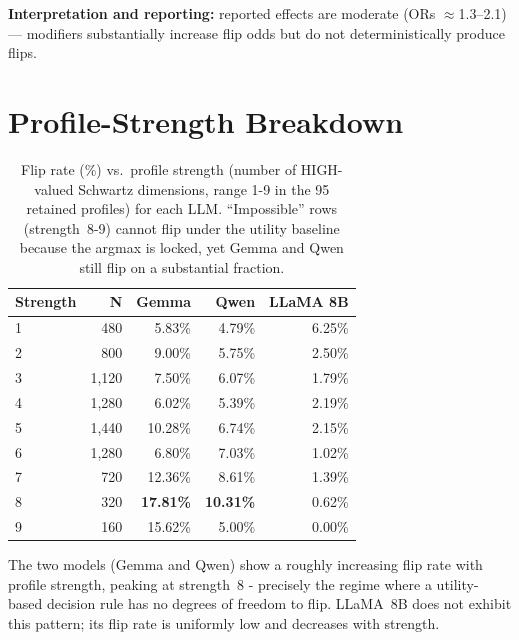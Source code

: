 \documentclass[11pt]{article}
\begin{document}
\textbf{Interpretation and reporting:} reported effects are moderate (ORs $\approx$1.3–2.1) — modifiers substantially increase flip odds but do not deterministically produce flips. 

\section{Profile-Strength Breakdown}
\label{app:strength}

\begin{table}[t]
\centering\small
\begin{tabular}{lrrrr}
\toprule
\textbf{Strength} & \textbf{N} & \textbf{Gemma} & \textbf{Qwen} & \textbf{LLaMA 8B} \\
\midrule
1  &   480  &  5.83\%  &  4.79\%  &  6.25\% \\
2  &   800  &  9.00\%  &  5.75\%  &  2.50\% \\
3  & 1{,}120 &  7.50\%  &  6.07\%  &  1.79\% \\
4  & 1{,}280 &  6.02\%  &  5.39\%  &  2.19\% \\
5  & 1{,}440 & 10.28\%  &  6.74\%  &  2.15\% \\
6  & 1{,}280 &  6.80\%  &  7.03\%  &  1.02\% \\
7  &   720  & 12.36\%  &  8.61\%  &  1.39\% \\
8  &   320  & \textbf{17.81\%} & \textbf{10.31\%} &  0.62\% \\
9  &   160  & 15.62\%  &  5.00\%  &  0.00\% \\
\bottomrule
\end{tabular}
\caption{Flip rate (\%) vs.\ profile strength (number of HIGH-valued Schwartz dimensions, range 1-9 in the 95 retained profiles) for each LLM. ``Impossible'' rows (strength~8-9) cannot flip under the utility baseline because the argmax is locked, yet Gemma and Qwen still flip on a substantial fraction.}
\label{tab:strength}
\end{table}

The two models (Gemma and Qwen) show a roughly increasing flip rate with profile strength, peaking at strength~8 - precisely the regime where a utility-based decision rule has no degrees of freedom to flip. LLaMA~8B does not exhibit this pattern; its flip rate is uniformly low and decreases with strength.
\end{document}
